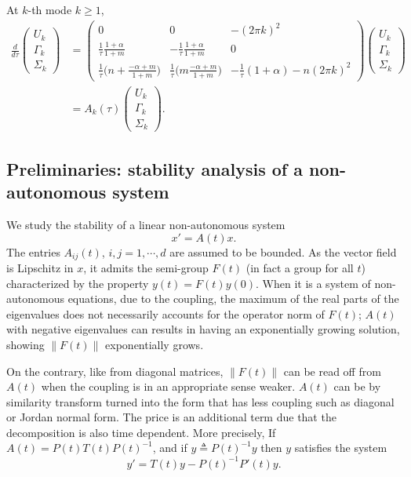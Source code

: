 \documentclass[a4paper,11pt]{article}
\theoremstyle{remark}
\begin{document}
At $k$-th mode $k\ge1$,
\begin{align}
  \frac{d}{d\tau}
  \begin{pmatrix}
   U_k \\ \Gamma_k \\ \Sigma_k
  \end{pmatrix} &=
  \begin{pmatrix}
   0 & 0 & -(2\pi k)^2\\
   \frac{1}{\tau}\frac{1+\alpha}{1+m} & -\frac{1}{\tau}\frac{1+\alpha}{1+m} & 0\\
   \frac{1}{\tau}\Big( n+ \frac{-\alpha+m}{1+m}\Big) &
   \frac{1}{\tau}\Big(m\frac{-\alpha+m}{1+m}\Big) &
   -\frac{1}{\tau}(1+\alpha) -n(2\pi k)^2
  \end{pmatrix}
  \begin{pmatrix}
   U_k \\ \Gamma_k \\ \Sigma_k
  \end{pmatrix} \nonumber\\
  &=A_k(\tau)\begin{pmatrix}
   U_k \\ \Gamma_k \\ \Sigma_k
  \end{pmatrix}.  \label{eq:k-system}
\end{align}


\subsection{Preliminaries: stability analysis of a non-autonomous system}
We study the stability of a linear non-autonomous system
$$ x'=A(t) x.$$
The entries $A_{ij}(t)$, $i,j=1,\cdots,d$ are assumed to be bounded. As the vector field is Lipschitz in $x$, it admits the semi-group $F(t)$ (in fact a group for all $t$) characterized by the property $y(t)=F(t)y(0)$. When it is a system of non-autonomous equations, due to the coupling, the maximum of the real parts of the eigenvalues does not necessarily accounts for the operator norm of $F(t)$; $A(t)$ with negative eigenvalues can results in having an exponentially growing solution, showing $\|F(t)\|$ exponentially grows.

On the contrary, like from diagonal matrices, $\|F(t)\|$ can be read off from $A(t)$ when the coupling is in an appropriate sense weaker. $A(t)$ can be by similarity transform turned into the form that has less coupling such as diagonal or Jordan normal form. The price is an additional term due that the decomposition is also time dependent. More precisely, If $A(t) = P(t)T(t)P(t)^{-1}$, and if $y\triangleq P(t)^{-1}y$ then $y$ satisfies the system
$$ y' = T(t)y - P(t)^{-1}P'(t)y.$$
\end{document}
